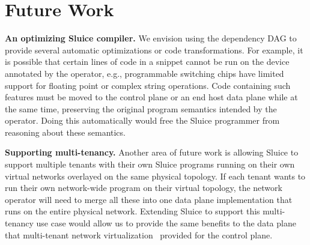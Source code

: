 \section{Future Work}
\textbf{An optimizing Sluice compiler.} We envision using the dependency DAG to
provide several automatic optimizations or code transformations. For example,
it is possible that certain lines of code in a snippet cannot be run on the
device annotated by the operator, e.g., programmable switching chips have
limited support for floating point or complex string operations. Code
containing such features must be moved to the control plane or an end host data
plane while at the same time, preserving the original program semantics
intended by the operator. Doing this automatically would free the Sluice
programmer from reasoning about these semantics.

\textbf{Supporting multi-tenancy.} Another area of future work is allowing
Sluice to support multiple tenants with their own Sluice
programs running on their own virtual networks overlayed on the same physical
topology. If each tenant wants to run their own network-wide program on their
virtual topology, the network operator will need to merge all these into one
data plane implementation that runs on the entire physical network. Extending
Sluice to support this multi-tenancy use case would allow us to provide the
same benefits to the data plane that multi-tenant network
virtualization~\cite{multitenant} provided for the control plane.




